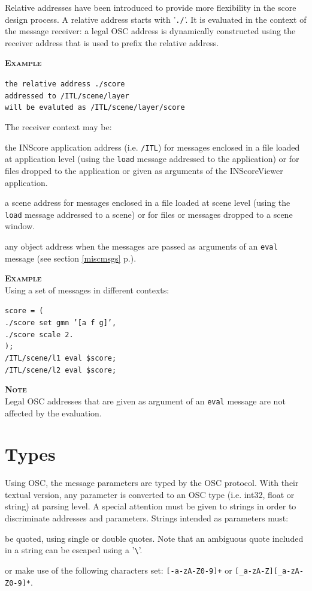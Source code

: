 \documentclass[a4paper,twoside]{report}
\newcommand{\sublevel}[1]	{\section{#1}}
\newcommand{\fullref}[1]	{\ref{#1} p.\pageref{#1}}
\newcommand{\OSC}[1]		{\texttt{#1}}
\newcommand{\example}		{\textbf{\hspace{-1.5cm}\textbf{\textsc{Example }}}}
\newcommand{\note}	[1]		{\vspace{2mm}\textbf{\hspace{-0.9cm}\textbf{\textsc{Note #1}}}}
\let\olditemize\itemize
\let\oldenditemize\enditemize
\renewenvironment{itemize} 	{\olditemize \setlength{\itemsep}{1mm}}{\oldenditemize}
\newcommand{\sample}	[1]			{\vspace{-2mm}\begin{center}\colorbox{mygrey}{
								\begin{minipage}[t]{0.9\columnwidth} 
								{\small \texttt{#1}}
								\end{minipage}}\end{center}}
\begin{document}
Relative addresses have been introduced to provide more flexibility in the score design process. A relative address starts with '\OSC{./}'. It is evaluated in the context of the message receiver: a legal OSC address is dynamically constructed using the receiver address that is used to prefix the relative address. 

\example
\sample{the relative address \hspace*{3mm}./score \\
addressed to \hspace*{15.4mm}/ITL/scene/layer\\
will be evaluted as \hspace*{4mm}/ITL/scene/layer/score
}

The receiver context may be:
\begin{itemize}
\item the INScore application address (i.e. \OSC{/ITL}) for messages enclosed in a file loaded at application level (using the \OSC{load} message addressed to the application) or for files dropped to the application or given as arguments of the INScoreViewer application.
\item a scene address for messages enclosed in a file loaded at scene level (using the \OSC{load} message addressed to a scene) or for files or messages dropped to a scene window.
\item any object address when the messages are passed as arguments of an \OSC{eval} message (see section \fullref{miscmsgs}).
\end{itemize}

\example\\
Using a set of messages in different contexts:
\sample{score = (\\
\hspace*{5mm}./score set gmn '[a f g]', \\
\hspace*{5mm}./score scale 2.\\
);\\
/ITL/scene/l1 eval \$score;\\
/ITL/scene/l2 eval \$score;
}

\note{}\\
Legal OSC addresses that are given as argument of an \OSC{eval} message are not affected by the evaluation.


\sublevel{Types}\label{scripttypes}

Using OSC, the message parameters are typed by the OSC protocol. 
With their textual version, any parameter is converted to an OSC type (i.e. int32, float or string) at parsing level.
A special attention must be given to strings in order to discriminate addresses and parameters. Strings intended as parameters must:
\begin{itemize}
\item be quoted, using single or double quotes. Note that an ambiguous quote included in a string can be escaped using a '\verb+\+'.
\item or make use of the following characters set: \OSC{[-a-zA-Z0-9]+} or \OSC{[\_a-zA-Z][\_a-zA-Z0-9]*}.
 \end{itemize}
\end{document}
